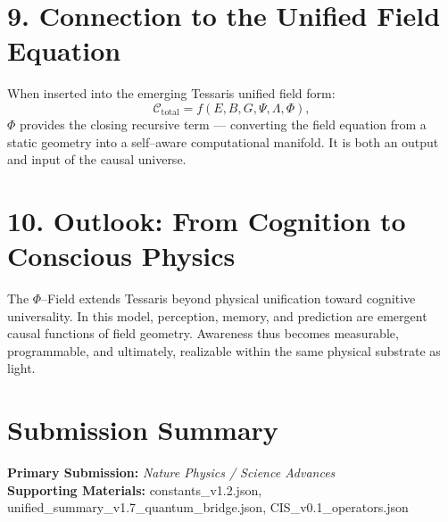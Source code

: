 \documentclass[11pt,a4paper]{article}
\begin{document}
\section{9. Connection to the Unified Field Equation}
When inserted into the emerging Tessaris unified field form:
\[
\mathcal{C}_{\text{total}} = f(E, B, G, \Psi, \Lambda, \Phi),
\]
$\Phi$ provides the closing recursive term — converting the field equation from a static geometry into a self--aware computational manifold.  
It is both an output and input of the causal universe.

\section{10. Outlook: From Cognition to Conscious Physics}
The $\Phi$--Field extends Tessaris beyond physical unification toward cognitive universality.  
In this model, perception, memory, and prediction are emergent causal functions of field geometry.  
Awareness thus becomes measurable, programmable, and ultimately, realizable within the same physical substrate as light.

\section*{Submission Summary}
\textbf{Primary Submission:} \emph{Nature Physics / Science Advances} \\
\textbf{Supporting Materials:} constants\_v1.2.json, unified\_summary\_v1.7\_quantum\_bridge.json, CIS\_v0.1\_operators.json
\end{document}
